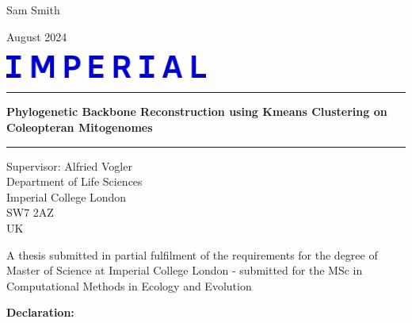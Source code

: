 \documentclass[12pt]{article}
\date{}
\begin{document}
\begin{titlepage}

  \begin{minipage}[t]{0.5\textwidth}
    \raggedright
    \large
    Sam Smith
  \end{minipage}%
  \begin{minipage}[t]{0.5\textwidth}
    \raggedleft
    \large
    August 2024
  \end{minipage}

  \vspace{0.6in}
  
  \begin{center}
    \includegraphics[width=0.5\textwidth]{imperiallogo.jpg}
  \end{center}
  
  \vspace{0.5in}
  
  \rule{\linewidth}{1.2mm}
  \begin{center}
    \LARGE
    \textbf{Phylogenetic Backbone Reconstruction using Kmeans Clustering on Coleopteran Mitogenomes}
  \end{center}
  \rule{\linewidth}{1.2mm}
  
  \vspace{0.5in}
  
  \begin{center}
    \large Supervisor: Alfried Vogler \\ Department of Life Sciences \\ Imperial College London \\ SW7 2AZ \\ UK
  \end{center}
  
  \vspace{0.6in}
  
  \begin{center}
    \large A thesis submitted in partial fulfilment of the requirements for the degree of Master of Science at Imperial College London - submitted for the MSc in Computational Methods in Ecology and Evolution
  \end{center}

\end{titlepage}

\onehalfspacing
\setcounter{tocdepth}{2}

\newpage
\textbf{\large Declaration:}
\end{document}
